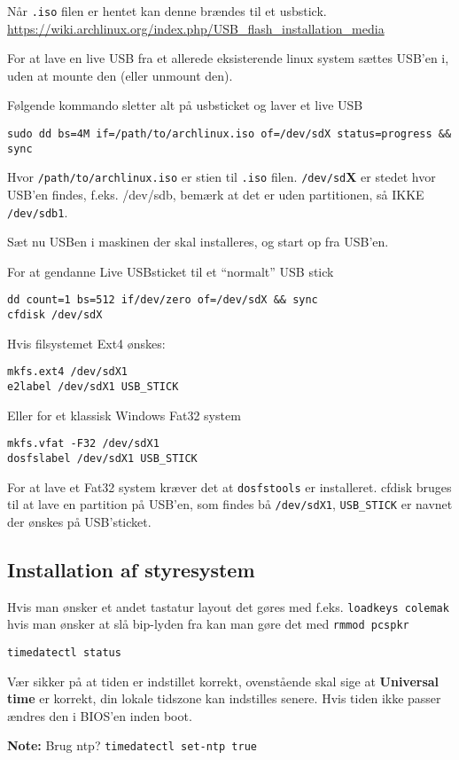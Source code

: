 \documentclass[10pt,a4paper,danish]{article}
\newcommand{\note}[1]{\begin{mdframed}[style=note]\textbf{Note:}
    #1\end{mdframed}}
\newcommand{\code}[1]{\colorbox{verbgray}{\texttt{#1}}}
\begin{document}
Når \texttt{.iso} filen er hentet kan denne brændes til et usbstick.
\url{https://wiki.archlinux.org/index.php/USB_flash_installation_media}

For at lave en live USB fra et allerede eksisterende linux system sættes USB'en
i, uden at mounte den (eller unmount den).

Følgende kommando sletter alt på usbsticket og laver et live USB
\begin{verbatim}
sudo dd bs=4M if=/path/to/archlinux.iso of=/dev/sdX status=progress && sync
\end{verbatim}

Hvor \texttt{/path/to/archlinux.iso} er stien til \texttt{.iso} filen.
\texttt{/dev/sd}\textbf{X} er stedet hvor USB'en findes, f.eks. /dev/sdb, bemærk
at det er uden partitionen, så IKKE \texttt{/dev/sdb1}.

Sæt nu USBen i maskinen der skal installeres, og start op fra USB'en.

\begin{mdframed}[style=boxy]
For at gendanne Live USBsticket til et ``normalt'' USB stick
\begin{verbatim}
dd count=1 bs=512 if/dev/zero of=/dev/sdX && sync
cfdisk /dev/sdX
\end{verbatim}

Hvis filsystemet Ext4 ønskes:
\begin{verbatim}
mkfs.ext4 /dev/sdX1
e2label /dev/sdX1 USB_STICK
\end{verbatim}
Eller for et klassisk Windows Fat32 system
\begin{verbatim}
mkfs.vfat -F32 /dev/sdX1
dosfslabel /dev/sdX1 USB_STICK
\end{verbatim}

For at lave et Fat32 system kræver det at \texttt{dosfstools} er installeret.
cfdisk bruges til at lave en partition på USB'en, som findes bå
\texttt{/dev/sdX1}, \texttt{USB\_STICK} er navnet der ønskes på USB'sticket.
\end{mdframed}

\subsection{Installation af styresystem}

Hvis man ønsker et andet tastatur layout det gøres med f.eks.
\code{loadkeys colemak} hvis man ønsker at slå bip-lyden fra kan man gøre det
med \code{rmmod pcspkr}

\begin{verbatim}
timedatectl status
\end{verbatim}
Vær sikker på at tiden er indstillet korrekt, ovenstående skal sige
at \textbf{Universal time} er korrekt, din lokale tidszone kan indstilles senere.
Hvis tiden ikke passer ændres den i BIOS'en inden boot.
\note{Brug ntp? \code{timedatectl set-ntp true}}
\end{document}
